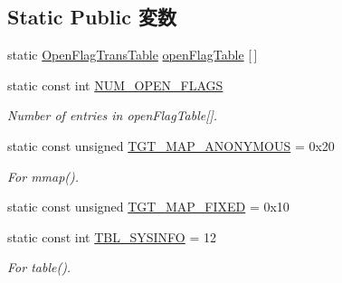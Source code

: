 \subsection*{Static Public 変数}
\begin{DoxyCompactItemize}
\item 
static \hyperlink{structOpenFlagTransTable}{OpenFlagTransTable} \hyperlink{classArmLinux32_ab1db5a531609b99b262cc849ea24765a}{openFlagTable} \mbox{[}$\,$\mbox{]}
\item 
static const int \hyperlink{classArmLinux32_ad85b9918c8f2c8739537a002dc1dc526}{NUM\_\-OPEN\_\-FLAGS}
\begin{DoxyCompactList}\small\item\em Number of entries in openFlagTable\mbox{[}\mbox{]}. \item\end{DoxyCompactList}\item 
static const unsigned \hyperlink{classArmLinux32_a0bbc267200567dd98250b99b6085a499}{TGT\_\-MAP\_\-ANONYMOUS} = 0x20
\begin{DoxyCompactList}\small\item\em For mmap(). \item\end{DoxyCompactList}\item 
static const unsigned \hyperlink{classArmLinux32_a0124e421d7846143bca15728b7a53e14}{TGT\_\-MAP\_\-FIXED} = 0x10
\item 
static const int \hyperlink{classArmLinux32_a02a979126f2aa34bcdfdc6ab92207d3b}{TBL\_\-SYSINFO} = 12
\begin{DoxyCompactList}\small\item\em For table(). \item\end{DoxyCompactList}\end{DoxyCompactItemize}
\label{_amgrpd41d8cd98f00b204e9800998ecf8427e}
